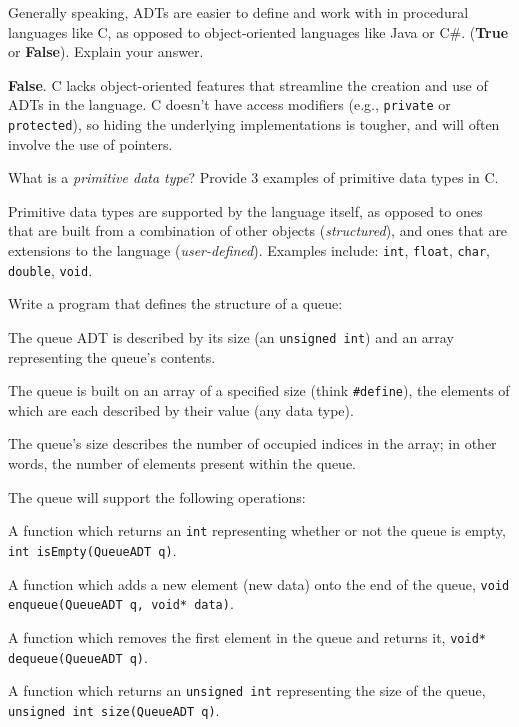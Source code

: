 
Generally speaking, ADTs are easier to define and work with in procedural languages like C, as opposed to object-oriented languages like Java or C\#. (\textbf{True} or \textbf{False}). Explain your answer.

\begin{answer} 
\textbf{False}. C lacks object-oriented features that streamline the creation and use of ADTs in the language. C doesn't have access modifiers (e.g., \texttt{private} or \texttt{protected}), so hiding the underlying implementations is tougher, and will often involve the use of pointers.
\end{answer}

\item What is a \emph{primitive data type}? Provide 3 examples of primitive data types in C.

\begin{answer}
Primitive data types are supported by the language itself, as opposed to ones that are built from a combination of other objects (\emph{structured}), and ones that are extensions to the language (\emph{user-defined}). Examples include: \texttt{int}, \texttt{float}, \texttt{char}, \texttt{double}, \texttt{void}.
\end{answer}

\item Write a program that defines the structure of a queue:
\begin{itemize} {\small
	\item The queue ADT is described by its size (an \texttt{unsigned int}) and an array representing the queue's contents.
	\item The queue is built on an array of a specified size (think \texttt{\#define}), the elements of which are each described by their value (any data type).
	\item The queue's size describes the number of occupied indices in the array; in other words, the number of elements present within the queue.
	\item The queue will support the following operations:}
	\begin{itemize} {\scriptsize
		\item A function which returns an \texttt{int} representing whether or not the queue is empty, \texttt{int isEmpty(QueueADT q)}.
		\item A function which adds a new element (new data) onto the end of the queue, \texttt{void enqueue(QueueADT q, void* data)}.
		\item A function which removes the first element in the queue and returns it, \texttt{void* dequeue(QueueADT q)}.
		\item A function which returns an \texttt{unsigned int} representing the size of the queue, \texttt{unsigned int size(QueueADT q)}.}
	\end{itemize}
\end{itemize}

\begin{answer}
	
\end{answer}


